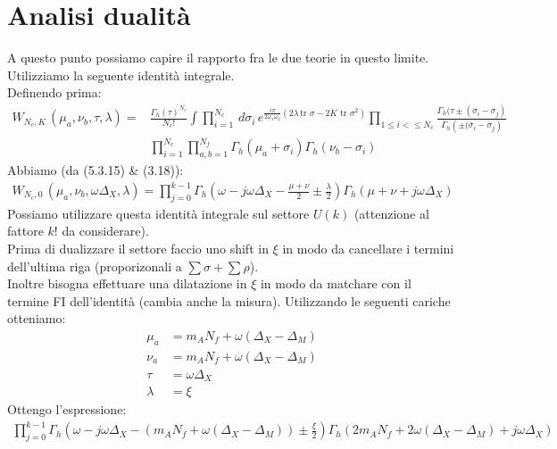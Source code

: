 \documentclass[a4paper,12pt]{article}
\begin{document}
 
\section{Analisi dualità}
A questo punto possiamo capire il rapporto fra le due teorie in questo limite.
Utilizziamo la seguente identità integrale.\\
Definendo prima:
\begin{align*}
W_{N_c , K } \, ( \mu_a, \nu_b , \tau, \lambda ) = & \frac{\Gamma_h (\tau)^{N_c}}{N_c !}
\int \prod_{i=1}^{N_c} \, d \sigma_i \, e^{ \frac{i \pi}{2 \omega_1 \omega_2} \left( 2 \lambda
\, \mbox{tr } \sigma - 2 K \mbox{ tr } \sigma^2 \right)} \prod_{1 \leq i < \leq N_c}
\frac{ \Gamma_h ( \tau \pm ( \sigma_i - \sigma_j) }{ \Gamma_h  \left( \pm (\sigma_i - \sigma_j \right) } \\
&  \prod_{i=1}^{N_c} \prod_{a,b=1}^{N_f} \Gamma_h ( \mu_a + \sigma_i) \Gamma_h(\nu_b- \sigma_i)
\end{align*} 
Abbiamo (da \citep{vanDeBult:2007}(5.3.15) \& \citep{Amariti:2014iza}(3.18)):
\begin{align*}
W_{N_c , 0 } \, ( \mu_a, \nu_b , \omega \Delta_X, \lambda )  = \prod_{j=0}^{k-1} \Gamma_h \left( \omega  - j \omega \Delta_X  - \frac{\mu+\nu}{2} \pm \frac{\lambda}{2} \right) 
\Gamma_h \left( \mu + \nu + j \omega \Delta_X \right)
\end{align*}
Possiamo utilizzare questa identità integrale sul settore $ U(k)$ (attenzione al fattore $k!$ da considerare).\\
Prima di dualizzare il settore faccio uno shift in $\xi$ in modo da cancellare i termini dell'ultima riga (proporizonali a $ \sum \sigma + \sum \rho$).\\
Inoltre bisogna effettuare una dilatazione in $\xi$ in modo da matchare con il termine FI dell'identità (cambia anche la misura).
Utilizzando le seguenti cariche otteniamo:
\begin{align*}
	\mu_a & =  m_A N_f + \omega( \Delta_X - \Delta_M ) \\
	\nu_a  &=  m_A N_f + \omega( \Delta_X -\Delta_M )\\
	\tau  & =  \omega \Delta_X  \\
	\lambda & = \xi
\end{align*}
Ottengo l'espressione:
\begin{align*}
\prod_{j=0}^{k-1} \Gamma_h \left( \omega - j \omega \Delta_X - ( m_A N_f + \omega(\Delta_X - \Delta_M)) \pm \frac{\xi}{2} \right) \Gamma_h \left( 2 m_A N_f + 2 \omega(\Delta_X - \Delta_M) + j \omega \Delta_X \right) 
\end{align*}
\end{document}
